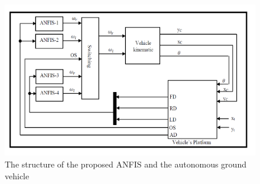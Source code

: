 \begin{figure}[H]
	\centering
	\includegraphics[width=0.7\linewidth]{figure/screenshot010}
	\caption[]{The structure of the proposed ANFIS and the autonomous ground vehicle}
	\label{fig:screenshoot010}
\end{figure}




